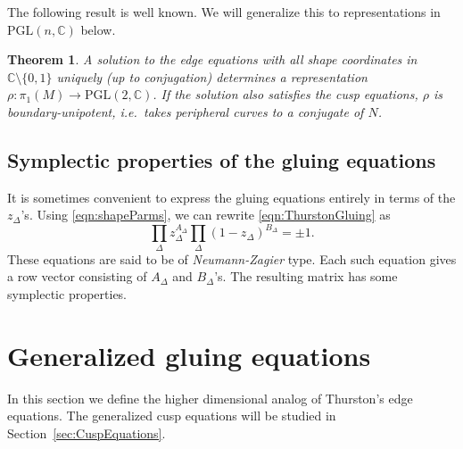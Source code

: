 \documentclass[12pt]{amsart}
\newtheorem{theorem}{Theorem}[section]
\theoremstyle{definition}
\newtheorem{remark}[theorem]{Remark}
\numberwithin{equation}{section}
\def\PGL{\mathrm{PGL}}
\def\C{\mathbb{C}}
\begin{document}
The following result is well known. We will generalize this to representations in $\mathrm{PGL}(n,\C)$ below.
\begin{theorem} A solution to the edge equations with all shape coordinates in $\C\setminus\{0,1\}$ uniquely (up to conjugation) determines a representation $\rho\colon\pi_1(M)\to \PGL(2,\C)$. If the solution also satisfies the cusp equations, $\rho$ is boundary-unipotent, i.e.~takes peripheral curves to a conjugate of $N$.
\end{theorem}


\subsection{Symplectic properties of the gluing equations}
It is sometimes convenient to express the gluing equations entirely in terms of the $z_\Delta$'s. Using \eqref{eqn:shapeParms}, we can rewrite \eqref{eqn:ThurstonGluing} as
\begin{equation}
\prod_\Delta z_\Delta^{A_\Delta} \prod_\Delta (1-z_\Delta)^{B_\Delta}=\pm 1.
\end{equation}
These equations are said to be of \emph{Neumann-Zagier} type. 
Each such equation gives a row vector consisting of $A_\Delta$ and $B_\Delta$'s. The resulting matrix has some symplectic properties.


\section{Generalized gluing equations}\label{sec:GeneralizedGluingEq}
In this section we define the higher dimensional analog of Thurston's edge equations. %
The generalized cusp equations will be studied in Section~\ref{sec:CuspEquations}.  
\end{document}
